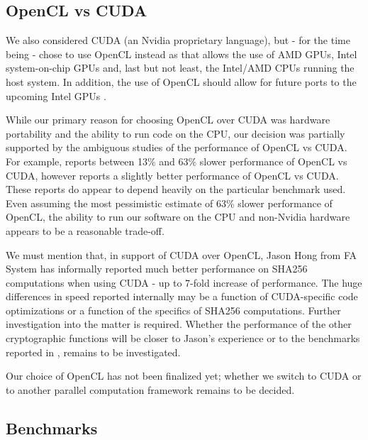 \documentclass{article}
\begin{document}

\subsection{OpenCL vs CUDA}
We also considered CUDA (an Nvidia proprietary language), but - for the time being - chose to use OpenCL instead as that allows the use of AMD GPUs, Intel system-on-chip GPUs and, last but not least, the Intel/AMD CPUs running the host system. In addition, the use of OpenCL should allow for future ports to the upcoming Intel GPUs \cite{forbes:IntelGPUupcoming}. 

While our primary reason for choosing OpenCL over CUDA was hardware portability and the ability to run code on the CPU, our decision was partially supported by the ambiguous studies of the performance of OpenCL vs CUDA. For example, \cite{KarimiEtAl:DBLP:CUDAvsOpenCL} reports between 13\% and 63\% slower performance of OpenCL vs CUDA, however \cite{MemetiLPKK17:CUDAvsOpenCL:DBLP:journals/corr} reports a slightly better performance of OpenCL vs CUDA. These reports do appear to depend heavily on the particular benchmark used. Even assuming the most pessimistic estimate of 63\% slower performance of OpenCL, the ability to run our software on the CPU and non-Nvidia hardware appears to be a reasonable trade-off. 

We must mention that, in support of CUDA over OpenCL, Jason Hong from FA System has informally reported much better performance on SHA256 computations when using CUDA - up to 7-fold increase of performance. The huge differences in speed reported internally may be a function of CUDA-specific code optimizations or a function of the specifics of SHA256 computations. Further investigation into the matter is required. Whether the performance of the other cryptographic functions will be closer to Jason's experience or to the benchmarks reported in \cite{KarimiEtAl:DBLP:CUDAvsOpenCL}, \cite{MemetiLPKK17:CUDAvsOpenCL:DBLP:journals/corr} remains to be investigated.

Our choice of OpenCL has not been finalized yet; whether we switch to CUDA or to another parallel computation framework remains to be decided.


\subsection{Benchmarks}
\end{document}
